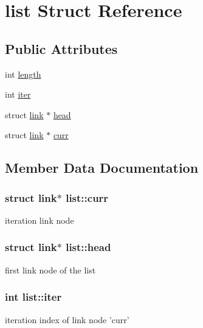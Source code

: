 \hypertarget{structlist}{}\section{list Struct Reference}
\label{structlist}
\subsection*{Public Attributes}
\begin{DoxyCompactItemize}
\item 
int \hyperlink{structlist_a26fae59927b62854e7b46a5e422f4f3f}{length}
\item 
int \hyperlink{structlist_ac12ea042abb3af18ba575315027337a9}{iter}
\item 
struct \hyperlink{structlink}{link} $\ast$ \hyperlink{structlist_ab545d380e121b4a9d0b17ce21c4a2a2c}{head}
\item 
struct \hyperlink{structlink}{link} $\ast$ \hyperlink{structlist_a2df4773c70102aeda825a3d7712592ef}{curr}
\end{DoxyCompactItemize}


\subsection{Member Data Documentation}
\hypertarget{structlist_a2df4773c70102aeda825a3d7712592ef}{}
\subsubsection[{curr}]{\setlength{\rightskip}{0pt plus 5cm}struct {\bf link}$\ast$ list\+::curr}\label{structlist_a2df4773c70102aeda825a3d7712592ef}
iteration link node \hypertarget{structlist_ab545d380e121b4a9d0b17ce21c4a2a2c}{}
\subsubsection[{head}]{\setlength{\rightskip}{0pt plus 5cm}struct {\bf link}$\ast$ list\+::head}\label{structlist_ab545d380e121b4a9d0b17ce21c4a2a2c}
first link node of the list \hypertarget{structlist_ac12ea042abb3af18ba575315027337a9}{}
\subsubsection[{iter}]{\setlength{\rightskip}{0pt plus 5cm}int list\+::iter}\label{structlist_ac12ea042abb3af18ba575315027337a9}
iteration index of link node 'curr' \hypertarget{structlist_a26fae59927b62854e7b46a5e422f4f3f}{}
